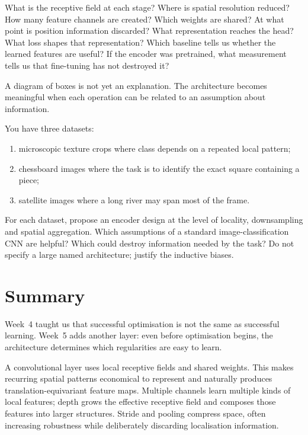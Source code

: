 What is the receptive field at each stage? Where is spatial resolution reduced? How many feature channels are created? Which weights are shared? At what point is position information discarded? What representation reaches the head? What loss shapes that representation? Which baseline tells us whether the learned features are useful? If the encoder was pretrained, what measurement tells us that fine-tuning has not destroyed it?

A diagram of boxes is not yet an explanation. The architecture becomes meaningful when each operation can be related to an assumption about information.

\begin{optionalexercise}[title={Optional design exercise --- choose the bias before the model}]
You have three datasets:
\begin{enumerate}[leftmargin=*]
  \item microscopic texture crops where class depends on a repeated local pattern;
  \item chessboard images where the task is to identify the exact square containing a piece;
  \item satellite images where a long river may span most of the frame.
\end{enumerate}
For each dataset, propose an encoder design at the level of locality, downsampling and spatial aggregation. Which assumptions of a standard image-classification CNN are helpful? Which could destroy information needed by the task? Do not specify a large named architecture; justify the inductive biases.
\end{optionalexercise}

\section{Summary}

Week~4 taught us that successful optimisation is not the same as successful learning. Week~5 adds another layer: even before optimisation begins, the architecture determines which regularities are easy to learn.

A convolutional layer uses local receptive fields and shared weights. This makes recurring spatial patterns economical to represent and naturally produces translation-equivariant feature maps. Multiple channels learn multiple kinds of local features; depth grows the effective receptive field and composes those features into larger structures. Stride and pooling compress space, often increasing robustness while deliberately discarding localisation information.

